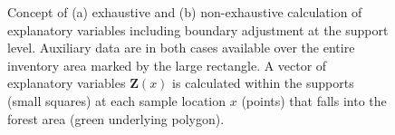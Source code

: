 \documentclass[article]{jss}
\begin{document}
\begin{figure}[htb]
	\begin{subfigure}[t]{0.5\textwidth}
		\centering
		\caption{} \label{fig:exh_nexh_and_boundweights_a}
		\end{subfigure}
	\begin{subfigure}[t]{0.5\textwidth}
		\centering
		\caption{} \label{fig:exh_nexh_and_boundweights_b}
	\end{subfigure}
\caption{Concept of (a) exhaustive and (b) non-exhaustive calculation of explanatory variables including boundary adjustment at the support level. Auxiliary data are in both cases available over the entire inventory area marked by the large rectangle. A vector of explanatory variables $\pmb{Z}(x)$ is calculated within the supports (small squares)  at each sample location $x$ (points) that falls into the forest area (green underlying polygon).}
\label{fig:exh_nexh_bw}
\end{figure}
\end{document}
